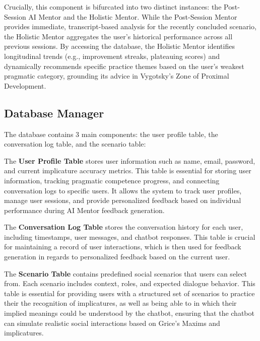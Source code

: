     Crucially, this component is bifurcated into two distinct instances: the Post-Session AI Mentor and the Holistic Mentor. While the Post-Session Mentor provides immediate, transcript-based analysis for the recently concluded scenario, the Holistic Mentor aggregates the user's historical performance across all previous sessions. By accessing the database, the Holistic Mentor identifies longitudinal trends (e.g., improvement streaks, plateauing scores) and dynamically recommends specific practice themes based on the user's weakest pragmatic category, grounding its advice in Vygotsky's Zone of Proximal Development.

    \subsection{Database Manager}

    The database contains 3 main components: the user profile table, the conversation log table, and the scenario table:

    The \textbf{User Profile Table} stores user information such as name, email, password, and current implicature accuracy metrics. This table is essential for storing user information, tracking pragmatic competence progress, and connecting conversation logs to specific users. It allows the system to track user profiles, manage user sessions, and provide personalized feedback based on individual performance during AI Mentor feedback generation. 

    The \textbf{Conversation Log Table} stores the conversation history for each user, including timestamps, user messages, and chatbot responses. This table is crucial for maintaining a record of user interactions, which is then used for feedback generation in regards to personalized feedback based on the current user. 

    The \textbf{Scenario Table} contains predefined social scenarios that users can select from. Each scenario includes context, roles, and expected dialogue behavior. This table is essential for providing users with a structured set of scenarios to practice their the recognition of implicatures, as well as being able to in which their implied meanings could be understood by the chatbot, ensuring that the chatbot can simulate realistic social interactions based on Grice's Maxims and implicatures.




